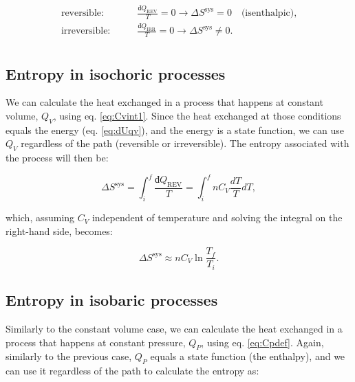 \documentclass[
  9pt,
]{extbook}
\theoremstyle{definition}
\theoremstyle{definition}
\theoremstyle{definition}
\theoremstyle{remark}
\begin{document}
\begin{equation}
\begin{aligned}
\text{reversible:} \qquad & \frac{đQ_{\mathrm{REV}}}{T} = 0 \longrightarrow \Delta S^{\mathrm{sys}} = 0 \quad \text{(isenthalpic),}\\
\text{irreversible:} \qquad & \frac{đQ_{\mathrm{IRR}}}{T}  = 0 \longrightarrow \Delta S^{\mathrm{sys}} \neq 0. \\
\end{aligned}
\label{eq:adiabaticent}
\end{equation}

\hypertarget{entropy-in-isochoric-processes}{%
\subsection{Entropy in isochoric processes}\label{entropy-in-isochoric-processes}}

We can calculate the heat exchanged in a process that happens at constant volume, \(Q_V\), using eq. \eqref{eq:Cvint1}. Since the heat exchanged at those conditions equals the energy (eq. \eqref{eq:dUqv}), and the energy is a state function, we can use \(Q_V\) regardless of the path (reversible or irreversible). The entropy associated with the process will then be:

\begin{equation}
\Delta S^{\mathrm{sys}} = \int_i^f \frac{đQ_{\mathrm{REV}}}{T} = \int_i^f nC_V \frac{dT}{T} dT,
\label{eq:sconstV1}
\end{equation}

which, assuming \(C_V\) independent of temperature and solving the integral on the right-hand side, becomes:

\begin{equation}
\Delta S^{\mathrm{sys}} \approx n C_V \ln \frac{T_f}{T_i}.
\label{eq:sconstV}
\end{equation}

\hypertarget{entropy-in-isobaric-processes}{%
\subsection{Entropy in isobaric processes}\label{entropy-in-isobaric-processes}}

Similarly to the constant volume case, we can calculate the heat exchanged in a process that happens at constant pressure, \(Q_P\), using eq. \eqref{eq:Cpdef}. Again, similarly to the previous case, \(Q_P\) equals a state function (the enthalpy), and we can use it regardless of the path to calculate the entropy as:
\end{document}
